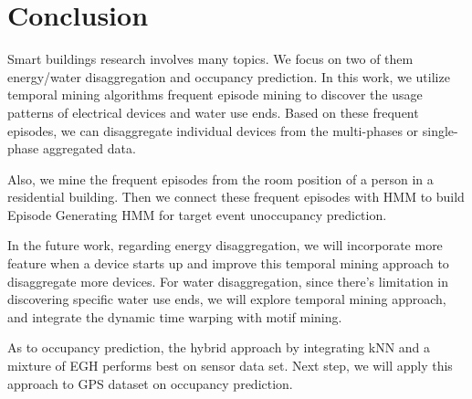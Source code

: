 \chapter{Conclusion}

Smart buildings research involves many topics. 
We focus on two of them energy/water disaggregation and occupancy prediction. 
In this work, we utilize temporal mining algorithms 
frequent episode mining to discover the usage patterns 
of electrical devices and water use ends. 
Based on these frequent episodes, 
we can disaggregate individual devices from the multi-phases 
or single-phase aggregated data. 

Also, we mine the frequent episodes from the room position of a 
person in a residential building. 
Then we connect these frequent episodes with HMM 
to build Episode Generating HMM for target event unoccupancy prediction. 

In the future work, 
regarding energy disaggregation, we will incorporate more feature 
when a device starts up and improve this temporal mining 
approach to disaggregate more devices. 
For water disaggregation, since there's limitation in 
discovering specific water use ends, 
we will explore temporal mining approach, 
and integrate the dynamic time warping with motif mining. 

As to occupancy prediction, 
the hybrid approach by integrating kNN and a mixture of EGH 
performs best on sensor data set. 
Next step, we will apply this approach to GPS dataset 
on occupancy prediction. 

